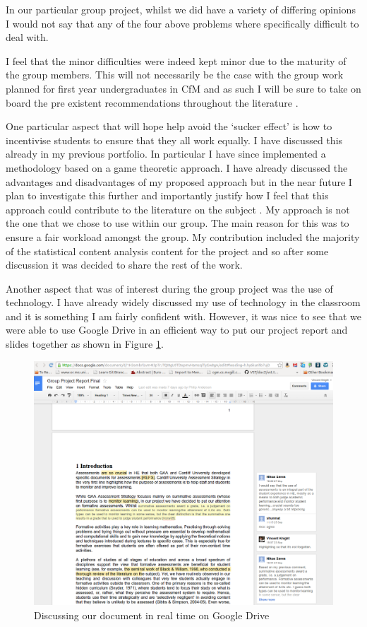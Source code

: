 \documentclass{article}
\begin{document}
In our particular group project, whilst we did have a variety of differing opinions I would not say that any of the four above problems where specifically difficult to deal with.

I feel that the minor difficulties were indeed kept minor due to the maturity of the group members. This will not necessarily be the case with the group work planned for first year undergraduates in CfM and as such I will be sure to take on board the pre existent recommendations throughout the literature \cite{bartlett_flip_1995, davies_groupwork_2009}.

One particular aspect that will hope help avoid the `sucker effect' is how to incentivise students to ensure that they all work equally. I have discussed this already in my previous portfolio. In particular I have since implemented a methodology based on a game theoretic approach. I have already discussed the advantages and disadvantages of my proposed approach but in the near future I plan to investigate this further and importantly justify how I feel that this approach could contribute to the literature on the subject \cite{lejk_survey_1996}. My approach is not the one that we chose to use within our group. The main reason for this was to ensure a fair workload amongst the group. My contribution included the majority of the statistical content analysis content for the project and so after some discussion it was decided to share the rest of the work.

Another aspect that was of interest during the group project was the use of technology. I have already widely discussed my use of technology in the classroom and it is something I am fairly confident with. However, it was nice to see that we were able to use Google Drive \cite{google_go_2012} in an efficient way to put our project report and slides together as shown in Figure \ref{repoongoogledrive}.

\begin{figure}[htdp]
\begin{center}
\includegraphics[width=14cm]{./Images/repoongoogledrive.png}
\end{center}
\caption{Discussing our document in real time on Google Drive}\label{repoongoogledrive}
\end{figure}
\end{document}
